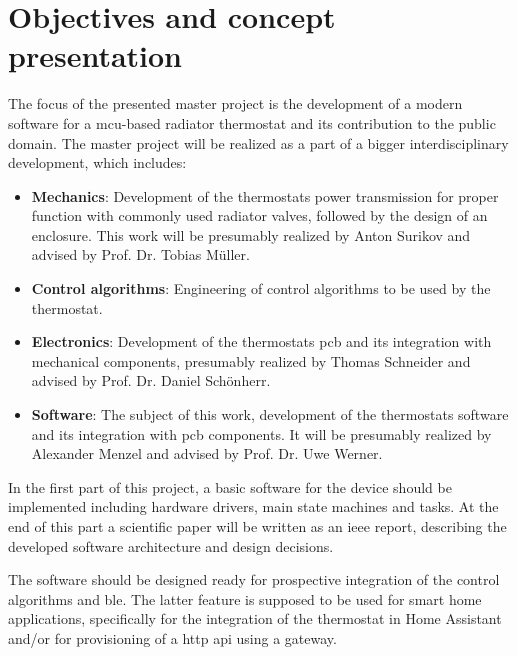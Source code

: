 %
%

\chapter{Objectives and concept presentation}
\label{chap:Objectives and concept presentation}
%
The focus of the presented master project is the development of a modern software for a \ac{mcu}-based radiator thermostat and its contribution to the public domain. The master project will be realized as a part of a bigger interdisciplinary development, which includes:

\begin{itemize}
	\item \textbf{Mechanics}: Development of the thermostats power transmission for proper function with commonly used radiator valves, followed by the design of an enclosure. This work will be presumably realized by Anton Surikov and advised by Prof. Dr. Tobias Müller.
	\item \textbf{Control algorithms}: Engineering of control algorithms to be used by the thermostat.
	\item \textbf{Electronics}: Development of the thermostats \ac{pcb} and its integration with mechanical components, presumably realized by Thomas Schneider and advised by Prof. Dr. Daniel Schönherr.
	\item \textbf{Software}: The subject of this work, development of the thermostats software and its integration with \acs{pcb} components. It will be presumably realized by Alexander Menzel and advised by Prof. Dr. Uwe Werner.
\end{itemize}

In the first part of this project, a basic software for the device should be implemented including hardware drivers, main state machines and tasks. At the end of this part a scientific paper will be written as an \ac{ieee} report, describing the developed software architecture and design decisions.

The software should be designed ready for prospective integration of the control algorithms and \ac{ble}. The latter feature is supposed to be used for smart home applications, specifically for the integration of the thermostat in Home Assistant and/or for provisioning of a \ac{http} \ac{api} using a gateway.

